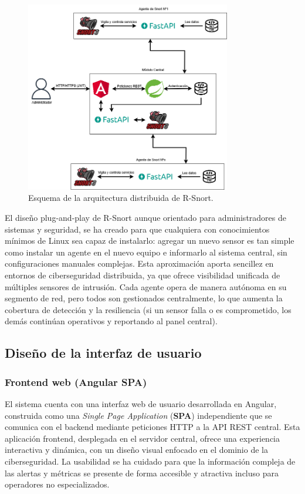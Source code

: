 \documentclass[11pt,a4paper,twoside]{report}
\begin{document}
\newpage

\begin{figure}[h!]
	\includegraphics[width=0.8\textwidth]{documento/6.png}
	\caption{Esquema de la arquitectura distribuida de R-Snort.}
	\label{fig:arquitectura}
\end{figure}

El diseño plug-and-play de R-Snort aunque orientado para administradores de sistemas y seguridad, se ha creado para que cualquiera con conocimientos mínimos de Linux sea capaz de instalarlo: agregar un nuevo sensor es tan simple como instalar un agente en el nuevo equipo e informarlo al sistema central, sin configuraciones manuales complejas. Esta aproximación aporta sencillez en entornos de ciberseguridad distribuida, ya que ofrece visibilidad unificada de múltiples sensores de intrusión. Cada agente opera de manera autónoma en su segmento de red, pero todos son gestionados centralmente, lo que aumenta la cobertura de detección y la resiliencia (si un sensor falla o es comprometido, los demás continúan operativos y reportando al panel central).

\subsection{Diseño de la interfaz de usuario}

\subsubsection{Frontend web (Angular SPA)}

El sistema cuenta con una interfaz web de usuario desarrollada en Angular, construida como una \emph{Single Page Application} (\textbf{SPA}) independiente que se comunica con el backend mediante peticiones HTTP a la API REST central. Esta aplicación frontend, desplegada en el servidor central, ofrece una experiencia interactiva y dinámica, con un diseño visual enfocado en el dominio de la ciberseguridad. La usabilidad se ha cuidado para que la información compleja de las alertas y métricas se presente de forma accesible y atractiva incluso para operadores no especializados.\newline
\end{document}
